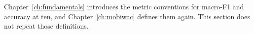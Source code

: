 \begin{description}
\end{description}

Chapter~\ref{ch:fundamentals} introduces the metric conventions for macro-F1 and
accuracy at ten, and Chapter~\ref{ch:mobiwac} defines them again. This section does not
repeat those definitions.

